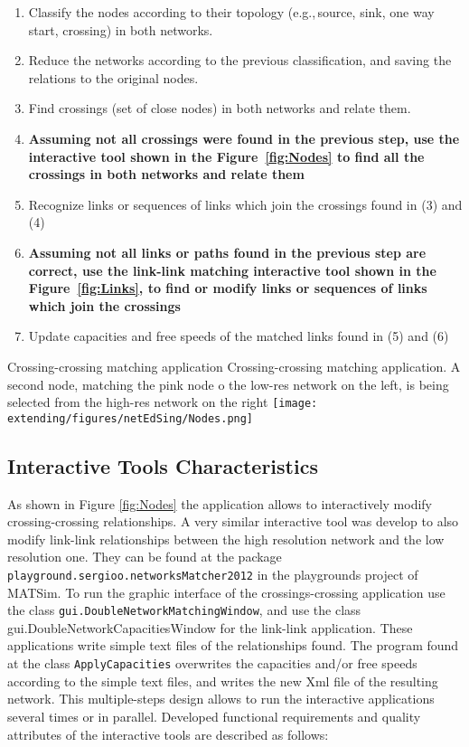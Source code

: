 \begin{enumerate}
\item Classify the nodes according to their topology (e.g.,\,source, sink, one way start, crossing) in both networks.
\item Reduce the networks according to the previous classification, and saving the relations to the original nodes.
\item Find crossings (set of close nodes) in both networks and relate them.
\item \textbf{Assuming not all crossings were found in the previous step, use the interactive tool shown in the Figure~\ref{fig:Nodes} to find all the crossings in both networks and relate them}
\item Recognize links or sequences of links which join the crossings found in (3) and (4)
\item \textbf{Assuming not all links or paths found in the previous step are correct, use the link-link matching interactive tool shown in the Figure~\ref{fig:Links}, to find or modify links or sequences of links which join the crossings}
\item Update capacities and free speeds of the matched links found in (5) and (6)
\end{enumerate}

\createfigure
{Crossing-crossing matching application}
{Crossing-crossing matching application. A second node, matching the pink node o the low-res network on the left, is being selected from the high-res network on the right}
{\label{fig:Nodes}}
{\texttt{[image: extending/figures/netEdSing/Nodes.png]}}
{}

\subsection{Interactive Tools Characteristics}
As shown in Figure \ref{fig:Nodes} the application allows to interactively modify crossing-crossing relationships. A very similar interactive tool was develop to also modify link-link relationships between the high resolution network and the low resolution one. They can be found at the package \lstinline|playground.sergioo.networksMatcher2012| in the playgrounds project of MATSim. To run the graphic interface of the crossings-crossing application use the class \lstinline|gui.DoubleNetworkMatchingWindow|, and use the class gui.DoubleNetworkCapacitiesWindow for the link-link application. These applications write simple text files of the relationships found. The program found at the class \lstinline|ApplyCapacities| overwrites the capacities and/or free speeds according to the simple text files, and writes the new Xml file of the resulting network. This multiple-steps design allows to run the interactive applications several times or in parallel. Developed functional requirements and quality attributes of the interactive tools are described as follows:

